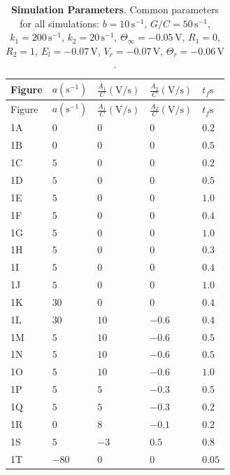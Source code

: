 \documentclass[10pt,a4paper,onecolumn]{article}
\begin{document}
\hypertarget{tbl:4}{}
\begin{longtable}[]{@{}lllll@{}}
\caption{\label{tbl:4}\textbf{Simulation Parameters}. Common parameters
for all simulations: \(b = 10\, \mathrm{s^{-1}}\),
\(G/C = 50\, \mathrm{s^{-1}}\), \(k_1 = 200\, \mathrm{s^{-1}}\),
\(k_2 = 20\, \mathrm{s^{-1}}\),
\(\Theta_{\infty} = -0.05\, \mathrm{V}\), \(R_1 = 0\), \(R_2 = 1\),
\(E_l = -0.07\, \mathrm{V}\), \(V_r = -0.07\, \mathrm{V}\),
\(\Theta_r = -0.06\, \mathrm{V}\). }\tabularnewline
\toprule
Figure & \(a (\mathrm{s^{-1}})\) & \(\frac{A_1}{C} (\mathrm{V/s})\) &
\(\frac{A_2}{C} (\mathrm{V/s})\) & \(t_f \mathrm{s}\)\tabularnewline
\midrule
\endfirsthead
\toprule
Figure & \(a (\mathrm{s^{-1}})\) & \(\frac{A_1}{C} (\mathrm{V/s})\) &
\(\frac{A_2}{C} (\mathrm{V/s})\) & \(t_f \mathrm{s}\)\tabularnewline
\midrule
\endhead
1A & \(0\) & \(0\) & \(0\) & \(0.2\)\tabularnewline
1B & \(0\) & \(0\) & \(0\) & \(0.5\)\tabularnewline
1C & \(5\) & \(0\) & \(0\) & \(0.2\)\tabularnewline
1D & \(5\) & \(0\) & \(0\) & \(0.5\)\tabularnewline
1E & \(5\) & \(0\) & \(0\) & \(1.0\)\tabularnewline
1F & \(5\) & \(0\) & \(0\) & \(0.4\)\tabularnewline
1G & \(5\) & \(0\) & \(0\) & \(1.0\)\tabularnewline
1H & \(5\) & \(0\) & \(0\) & \(0.3\)\tabularnewline
1I & \(5\) & \(0\) & \(0\) & \(0.4\)\tabularnewline
1J & \(5\) & \(0\) & \(0\) & \(1.0\)\tabularnewline
1K & \(30\) & \(0\) & \(0\) & \(0.4\)\tabularnewline
1L & \(30\) & \(10\) & \(-0.6\) & \(0.4\)\tabularnewline
1M & \(5\) & \(10\) & \(-0.6\) & \(0.5\)\tabularnewline
1N & \(5\) & \(10\) & \(-0.6\) & \(0.5\)\tabularnewline
1O & \(5\) & \(10\) & \(-0.6\) & \(1.0\)\tabularnewline
1P & \(5\) & \(5\) & \(-0.3\) & \(0.5\)\tabularnewline
1Q & \(5\) & \(5\) & \(-0.3\) & \(0.2\)\tabularnewline
1R & \(0\) & \(8\) & \(-0.1\) & \(0.2\)\tabularnewline
1S & \(5\) & \(-3\) & \(0.5\) & \(0.8\)\tabularnewline
1T & \(-80\) & \(0\) & \(0\) & \(0.05\)\tabularnewline
\bottomrule
\end{longtable}

\pagebreak
\end{document}
